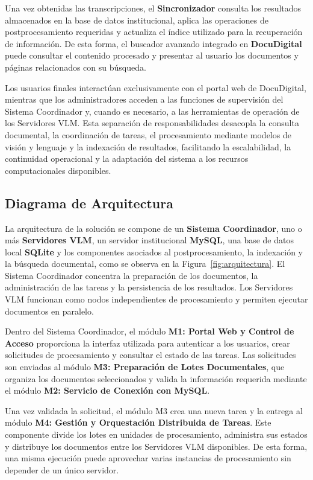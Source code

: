 Una vez obtenidas las transcripciones, el \textbf{Sincronizador} consulta los resultados almacenados en la base de datos institucional, aplica las operaciones de postprocesamiento requeridas y actualiza el índice utilizado para la recuperación de información. De esta forma, el buscador avanzado integrado en \textbf{DocuDigital} puede consultar el contenido procesado y presentar al usuario los documentos y páginas relacionados con su búsqueda.

Los usuarios finales interactúan exclusivamente con el portal web de DocuDigital, mientras que los administradores acceden a las funciones de supervisión del Sistema Coordinador y, cuando es necesario, a las herramientas de operación de los Servidores VLM. Esta separación de responsabilidades desacopla la consulta documental, la coordinación de tareas, el procesamiento mediante modelos de visión y lenguaje y la indexación de resultados, facilitando la escalabilidad, la continuidad operacional y la adaptación del sistema a los recursos computacionales disponibles.

\subsection{Diagrama de Arquitectura}

La arquitectura de la solución se compone de un \textbf{Sistema Coordinador}, uno o más \textbf{Servidores VLM}, un servidor institucional \textbf{MySQL}, una base de datos local \textbf{SQLite} y los componentes asociados al postprocesamiento, la indexación y la búsqueda documental, como se observa en la Figura~\ref{fig:arquitectura}. El Sistema Coordinador concentra la preparación de los documentos, la administración de las tareas y la persistencia de los resultados. Los Servidores VLM funcionan como nodos independientes de procesamiento y permiten ejecutar documentos en paralelo.


Dentro del Sistema Coordinador, el módulo \textbf{M1: Portal Web y Control de Acceso} proporciona la interfaz utilizada para autenticar a los usuarios, crear solicitudes de procesamiento y consultar el estado de las tareas. Las solicitudes son enviadas al módulo \textbf{M3: Preparación de Lotes Documentales}, que organiza los documentos seleccionados y valida la información requerida mediante el módulo \textbf{M2: Servicio de Conexión con MySQL}.


Una vez validada la solicitud, el módulo M3 crea una nueva tarea y la entrega al módulo \textbf{M4: Gestión y Orquestación Distribuida de Tareas}. Este componente divide los lotes en unidades de procesamiento, administra sus estados y distribuye los documentos entre los Servidores VLM disponibles. De esta forma, una misma ejecución puede aprovechar varias instancias de procesamiento sin depender de un único servidor.

